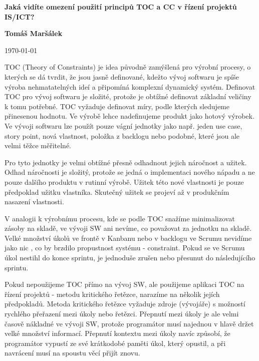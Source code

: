 \documentclass[11pt]{article}
\begin{document}
\thispagestyle{empty}
\begin{center}
    \Large
    \textbf{Jaká vidíte omezení použití principů TOC a CC v řízení projektů IS/ICT?}



    \vspace{.3cm}
    \large
    \textbf{Tomáš Maršálek}

    \today

    \vspace{.5cm}
\end{center}

TOC (Theory of Constraints) je idea původně zamýšlená pro výrobní procesy, o
kterých se dá tvrdit, že jsou jasně definované, kdežto vývoj softwaru je spíše
výroba nehmatatelných ideí a připomíná komplexní dynamický systém.  Definovat
TOC pro vývoj softwaru je složité, protože je obtížné definovat základní
veličiny k tomu potřebné.  TOC vyžaduje definovat míry, podle kterých sledujeme
přinesenou hodnotu. Ve výrobě lehce nadefinujeme produkt jako hotový výrobek.
Ve vývoji softwaru lze použít pouze vágní jednotky jako např. jeden use case,
story point, nová vlastnost, položka z backlogu nebo podobné, které jsou ale
velmi těžce měřitelné.

Pro tyto jednotky je velmi obtížné přesně odhadnout jejich náročnost a užitek.
Odhad náročnosti je složitý, protože se jedná o implementaci nového nápadu a ne
pouze dalšího produktu v rutinní výrobě. Užitek této nové vlastnosti je pouze
předpoklad užitku vlastníka. Skutečný užitek se projeví až v produkčním
nasazení vlastnosti. 

V analogii k výrobnímu procesu, kde se podle TOC snažíme minimalizovat zásoby
na skladě, ve vývoji SW ani nevíme, co považovat za jednotku na skladě. Velké
množství úkolů ve frontě v Kanbanu nebo v backlogu ve Scrumu nevidíme jako nic
, co by brzdilo propustnost systému - constraint. Pokud se ve Scrumu úkol
nestihl do konce sprintu, je jednoduše zrušen nebo přesunut do následujícího
sprintu.

Pokud nepoužijeme TOC přímo na vývoj SW, ale použijeme aplikaci TOC na řízení
projektů - metodu kritického řetězce, narazíme na několik jejích předpokladů.
Metoda kritického řetězce vyžaduje zdroje (vývojáře) s možností rychlého
přeřazení mezi úkoly nebo řetězci. Přepnutí mezi úkoly je ale velmi časově
nákladné ve vývoji SW, protože programátor musí najednou v hlavě držet velké
množství informací. Přepnutí kontextu mezi úkoly navíc způsobí, že programátor
vypustí ze své krátkodobé paměti úkol, který opustil, a při navrácení musí na
spoustu věcí přijít znovu.
\end{document}
